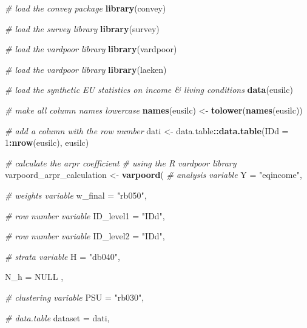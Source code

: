 \documentclass[
]{book}
\newenvironment{Shaded}{\begin{snugshade}}{\end{snugshade}}
\newcommand{\AttributeTok}[1]{\textcolor[rgb]{0.13,0.29,0.53}{#1}}
\newcommand{\CommentTok}[1]{\textcolor[rgb]{0.56,0.35,0.01}{\textit{#1}}}
\newcommand{\ConstantTok}[1]{\textcolor[rgb]{0.56,0.35,0.01}{#1}}
\newcommand{\DecValTok}[1]{\textcolor[rgb]{0.00,0.00,0.81}{#1}}
\newcommand{\FunctionTok}[1]{\textcolor[rgb]{0.13,0.29,0.53}{\textbf{#1}}}
\newcommand{\NormalTok}[1]{#1}
\newcommand{\OtherTok}[1]{\textcolor[rgb]{0.56,0.35,0.01}{#1}}
\newcommand{\SpecialCharTok}[1]{\textcolor[rgb]{0.81,0.36,0.00}{\textbf{#1}}}
\newcommand{\StringTok}[1]{\textcolor[rgb]{0.31,0.60,0.02}{#1}}
\begin{document}
\begin{Shaded}
\begin{Highlighting}[]
\CommentTok{\# load the convey package}
\FunctionTok{library}\NormalTok{(convey)}

\CommentTok{\# load the survey library}
\FunctionTok{library}\NormalTok{(survey)}

\CommentTok{\# load the vardpoor library}
\FunctionTok{library}\NormalTok{(vardpoor)}

\CommentTok{\# load the vardpoor library}
\FunctionTok{library}\NormalTok{(laeken)}

\CommentTok{\# load the synthetic EU statistics on income \& living conditions}
\FunctionTok{data}\NormalTok{(eusilc)}

\CommentTok{\# make all column names lowercase}
\FunctionTok{names}\NormalTok{(eusilc) }\OtherTok{\textless{}{-}} \FunctionTok{tolower}\NormalTok{(}\FunctionTok{names}\NormalTok{(eusilc))}

\CommentTok{\# add a column with the row number}
\NormalTok{dati }\OtherTok{\textless{}{-}}\NormalTok{ data.table}\SpecialCharTok{::}\FunctionTok{data.table}\NormalTok{(}\AttributeTok{IDd =} \DecValTok{1}\SpecialCharTok{:}\FunctionTok{nrow}\NormalTok{(eusilc), eusilc)}

\CommentTok{\# calculate the arpr coefficient}
\CommentTok{\# using the R vardpoor library}
\NormalTok{varpoord\_arpr\_calculation }\OtherTok{\textless{}{-}}
  \FunctionTok{varpoord}\NormalTok{(}
    \CommentTok{\# analysis variable}
    \AttributeTok{Y =} \StringTok{"eqincome"}\NormalTok{,}
    
    \CommentTok{\# weights variable}
    \AttributeTok{w\_final =} \StringTok{"rb050"}\NormalTok{,}
    
    \CommentTok{\# row number variable}
    \AttributeTok{ID\_level1 =} \StringTok{"IDd"}\NormalTok{,}
    
    \CommentTok{\# row number variable}
    \AttributeTok{ID\_level2 =} \StringTok{"IDd"}\NormalTok{,}
    
    \CommentTok{\# strata variable}
    \AttributeTok{H =} \StringTok{"db040"}\NormalTok{,}
    
    \AttributeTok{N\_h =} \ConstantTok{NULL}\NormalTok{ ,}
    
    \CommentTok{\# clustering variable}
    \AttributeTok{PSU =} \StringTok{"rb030"}\NormalTok{,}
    
    \CommentTok{\# data.table}
    \AttributeTok{dataset =}\NormalTok{ dati,}
    

\end{Highlighting}
\end{Shaded}
\end{document}
